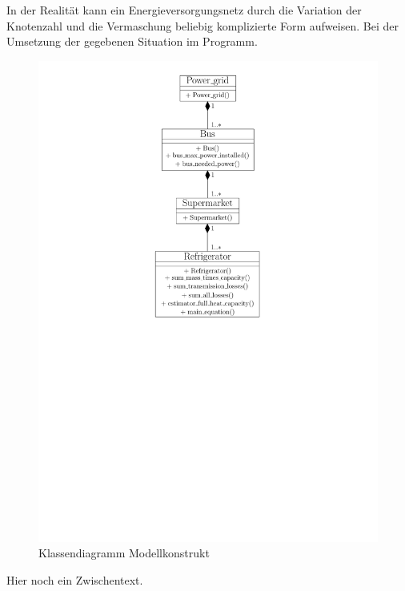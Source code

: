 In der Realität kann ein Energieversorgungsnetz durch die Variation der
Knotenzahl und die Vermaschung beliebig komplizierte Form aufweisen. Bei der
Umsetzung der gegebenen Situation im Programm.

\begin{figure}[h]
\caption{Klassendiagramm Modellkonstrukt}
	\label{klassendiagramm}
	\begin{center}
	\includegraphics[scale=0.8]{images/Theorie_Super/class_diagramm}
	\end{center}
\end{figure}

Hier noch ein Zwischentext.

